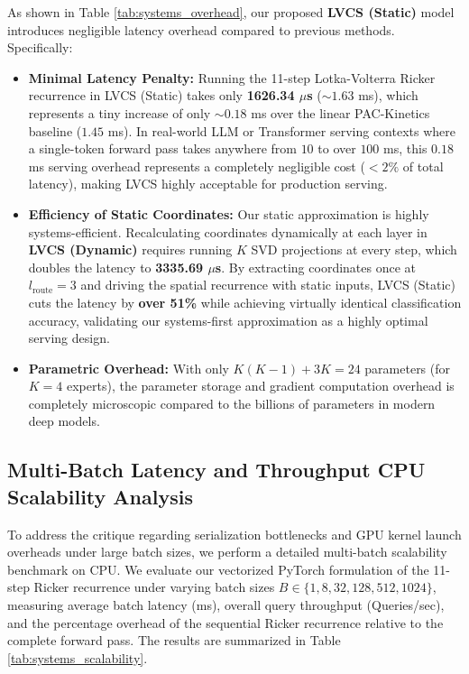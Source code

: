 As shown in Table \ref{tab:systems_overhead}, our proposed \textbf{LVCS (Static)} model introduces negligible latency overhead compared to previous methods.
Specifically:
\begin{itemize}
    \item \textbf{Minimal Latency Penalty:} Running the 11-step Lotka-Volterra Ricker recurrence in LVCS (Static) takes only \textbf{1626.34 $\mu$s} ($\sim 1.63$ ms), which represents a tiny increase of only $\sim 0.18$ ms over the linear PAC-Kinetics baseline ($1.45$ ms). In real-world LLM or Transformer serving contexts where a single-token forward pass takes anywhere from $10$ to over $100$ ms, this $0.18$ ms serving overhead represents a completely negligible cost ($< 2\%$ of total latency), making LVCS highly acceptable for production serving.
    \item \textbf{Efficiency of Static Coordinates:} Our static approximation is highly systems-efficient. Recalculating coordinates dynamically at each layer in \textbf{LVCS (Dynamic)} requires running $K$ SVD projections at every step, which doubles the latency to \textbf{3335.69 $\mu$s}. By extracting coordinates once at $l_{\text{route}} = 3$ and driving the spatial recurrence with static inputs, LVCS (Static) cuts the latency by \textbf{over 51\%} while achieving virtually identical classification accuracy, validating our systems-first approximation as a highly optimal serving design.
    \item \textbf{Parametric Overhead:} With only $K(K-1) + 3K = 24$ parameters (for $K=4$ experts), the parameter storage and gradient computation overhead is completely microscopic compared to the billions of parameters in modern deep models.
\end{itemize}

\subsection{Multi-Batch Latency and Throughput CPU Scalability Analysis}
To address the critique regarding serialization bottlenecks and GPU kernel launch overheads under large batch sizes, we perform a detailed multi-batch scalability benchmark on CPU. We evaluate our vectorized PyTorch formulation of the 11-step Ricker recurrence under varying batch sizes $B \in \{1, 8, 32, 128, 512, 1024\}$, measuring average batch latency (ms), overall query throughput (Queries/sec), and the percentage overhead of the sequential Ricker recurrence relative to the complete forward pass. The results are summarized in Table \ref{tab:systems_scalability}.

